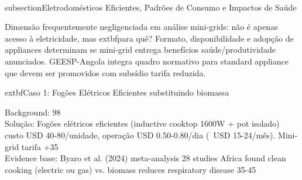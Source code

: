 \documentclass[12pt, a4paper]{article}
\begin{document}
{{{{{{{{{{{{\\subsection{Eletrodomésticos Eficientes, Padrões de Consumo e Impactos de Saúde}

Dimensão frequentemente negligenciada em análise mini-grids: não é apenas acesso à eletricidade, mas 	extbf{para quê}? Formato, disponibilidade e adopção de appliances determinam se mini-grid entrega benefícios saúde/produtividade anunciados. GEESP-Angola integra quadro normativo para standard appliance que devem ser promovidos com subsídio tarifa reduzida.

	extbf{Caso 1: Fogões Elétricos Eficientes substituindo biomassa}

Background: 98\\%

Solução: Fogões elétricos eficientes (inductive cooktop 1600W + pot isolado) custo USD 40-80/unidade, operação USD 0.50-0.80/dia (~USD 15-24/mês). Mini-grid tarifa +35\\%

Evidence base: Byaro et al. (2024) meta-analysis 28 studies Africa found clean cooking (electric ou gas) vs. biomass reduces respiratory disease 35-45\\%

}}}}}}}}}}}}
\end{document}
